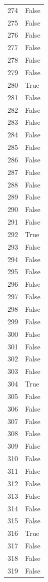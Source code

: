 \documentclass[
  letterpaper,
  DIV=11,
  numbers=noendperiod]{scrreprt}
\begin{document}
\begin{tabular}{ll}
274  &  False \\
275  &  False \\
276  &  False \\
277  &  False \\
278  &  False \\
279  &  False \\
280  &   True \\
281  &  False \\
282  &  False \\
283  &  False \\
284  &  False \\
285  &  False \\
286  &  False \\
287  &  False \\
288  &  False \\
289  &  False \\
290  &  False \\
291  &  False \\
292  &   True \\
293  &  False \\
294  &  False \\
295  &  False \\
296  &  False \\
297  &  False \\
298  &  False \\
299  &  False \\
300  &  False \\
301  &  False \\
302  &  False \\
303  &  False \\
304  &   True \\
305  &  False \\
306  &  False \\
307  &  False \\
308  &  False \\
309  &  False \\
310  &  False \\
311  &  False \\
312  &  False \\
313  &  False \\
314  &  False \\
315  &  False \\
316  &   True \\
317  &  False \\
318  &  False \\
319  &  False \\

\end{tabular}
\end{document}
